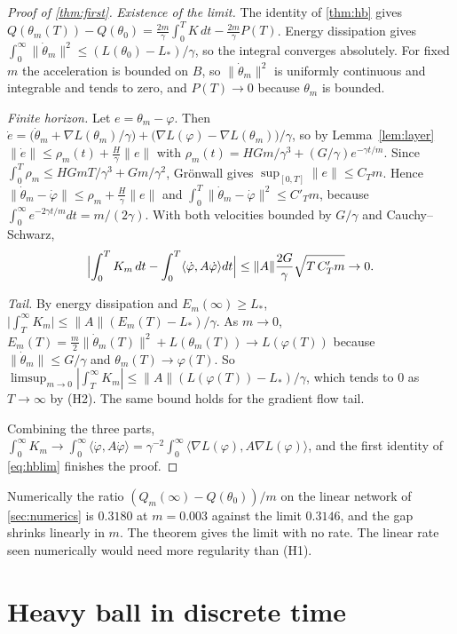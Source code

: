 \documentclass[11pt]{article}
\theoremstyle{remark}
\theoremstyle{definition}
\newcommand{\ip}[2]{\langle #1,#2\rangle}
\begin{document}
\begin{proof}[Proof of \cref{thm:first}]
\emph{Existence of the limit.} The identity of \cref{thm:hb} gives $Q(\theta_m(T))-Q(\theta_0)=\frac{2m}\gamma\int_0^TK\,dt-\frac{2m}\gamma P(T)$. Energy dissipation gives $\int_0^\infty\|\dot\theta_m\|^2\le(L(\theta_0)-L_*)/\gamma$, so the integral converges absolutely. For fixed $m$ the acceleration is bounded on $B$, so $\|\dot\theta_m\|^2$ is uniformly continuous and integrable and tends to zero, and $P(T)\to0$ because $\theta_m$ is bounded.

\emph{Finite horizon.} Let $e=\theta_m-\varphi$. Then $\dot e=\bigl(\dot\theta_m+\nabla L(\theta_m)/\gamma\bigr)+\bigl(\nabla L(\varphi)-\nabla L(\theta_m)\bigr)/\gamma$, so by Lemma~\ref{lem:layer} $\|\dot e\|\le\rho_m(t)+\frac H\gamma\|e\|$ with $\rho_m(t)=HGm/\gamma^3+(G/\gamma)e^{-\gamma t/m}$. Since $\int_0^T\rho_m\le HGmT/\gamma^3+Gm/\gamma^2$, Gr\"onwall gives $\sup_{[0,T]}\|e\|\le C_Tm$. Hence $\|\dot\theta_m-\dot\varphi\|\le\rho_m+\frac H\gamma\|e\|$ and $\int_0^T\|\dot\theta_m-\dot\varphi\|^2\le C'_Tm$, because $\int_0^\infty e^{-2\gamma t/m}dt=m/(2\gamma)$. With both velocities bounded by $G/\gamma$ and Cauchy--Schwarz,
\[
\Bigl|\int_0^TK_m\,dt-\int_0^T\ip{\dot\varphi}{A\dot\varphi}dt\Bigr|\le\|A\|\frac{2G}\gamma\sqrt{T\,C'_Tm}\to0 .
\]

\emph{Tail.} By energy dissipation and $E_m(\infty)\ge L_*$, $\bigl|\int_T^\infty K_m\bigr|\le\|A\|(E_m(T)-L_*)/\gamma$. As $m\to0$, $E_m(T)=\frac m2\|\dot\theta_m(T)\|^2+L(\theta_m(T))\to L(\varphi(T))$ because $\|\dot\theta_m\|\le G/\gamma$ and $\theta_m(T)\to\varphi(T)$. So $\limsup_{m\to0}|\int_T^\infty K_m|\le\|A\|(L(\varphi(T))-L_*)/\gamma$, which tends to $0$ as $T\to\infty$ by (H2). The same bound holds for the gradient flow tail.

Combining the three parts, $\int_0^\infty K_m\to\int_0^\infty\ip{\dot\varphi}{A\dot\varphi}=\gamma^{-2}\int_0^\infty\ip{\nabla L(\varphi)}{A\nabla L(\varphi)}$, and the first identity of \eqref{eq:hblim} finishes the proof.
\end{proof}

Numerically the ratio $(Q_m(\infty)-Q(\theta_0))/m$ on the linear network of \cref{sec:numerics} is $0.3180$ at $m=0.003$ against the limit $0.3146$, and the gap shrinks linearly in $m$. The theorem gives the limit with no rate. The linear rate seen numerically would need more regularity than (H1).

\section{Heavy ball in discrete time}\label{sec:disc}
\end{document}

